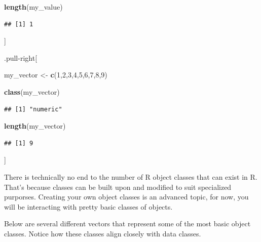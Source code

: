 \documentclass[
]{book}
\newenvironment{Shaded}{\begin{snugshade}}{\end{snugshade}}
\newcommand{\DecValTok}[1]{\textcolor[rgb]{0.00,0.00,0.81}{#1}}
\newcommand{\FunctionTok}[1]{\textcolor[rgb]{0.13,0.29,0.53}{\textbf{#1}}}
\newcommand{\NormalTok}[1]{#1}
\newcommand{\OtherTok}[1]{\textcolor[rgb]{0.56,0.35,0.01}{#1}}
\begin{document}
\begin{Shaded}
\begin{Highlighting}[]
\FunctionTok{length}\NormalTok{(my\_value)}
\end{Highlighting}
\end{Shaded}

\begin{verbatim}
## [1] 1
\end{verbatim}

{]}

.pull-right{[}

\begin{Shaded}
\begin{Highlighting}[]
\NormalTok{my\_vector }\OtherTok{\textless{}{-}} \FunctionTok{c}\NormalTok{(}\DecValTok{1}\NormalTok{,}\DecValTok{2}\NormalTok{,}\DecValTok{3}\NormalTok{,}\DecValTok{4}\NormalTok{,}\DecValTok{5}\NormalTok{,}\DecValTok{6}\NormalTok{,}\DecValTok{7}\NormalTok{,}\DecValTok{8}\NormalTok{,}\DecValTok{9}\NormalTok{)}

\FunctionTok{class}\NormalTok{(my\_vector)}
\end{Highlighting}
\end{Shaded}

\begin{verbatim}
## [1] "numeric"
\end{verbatim}

\begin{Shaded}
\begin{Highlighting}[]
\FunctionTok{length}\NormalTok{(my\_vector)}
\end{Highlighting}
\end{Shaded}

\begin{verbatim}
## [1] 9
\end{verbatim}

{]}

There is technically no end to the number of R object classes that can exist in R. That's because classes can be built upon and modified to suit specialized purporses. Creating your own object classes is an advanced topic, for now, you will be interacting with pretty basic classes of objects.

Below are several different vectors that represent some of the most basic object classes. Notice how these classes align closely with data classes.
\end{document}
